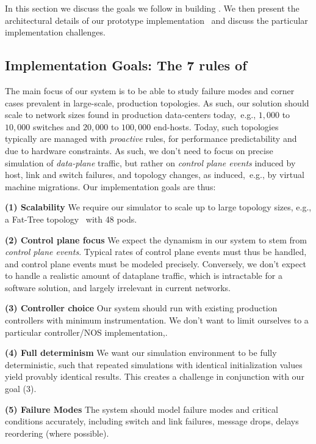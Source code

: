 In this section we discuss the goals we follow in building \projectname.
We then present the architectural details of our prototype implementation~\cite{prototype}
and discuss the particular implementation challenges.

\subsection{Implementation Goals: The 7 rules of \projectname{}}

The main focus of our system is to be able to study failure modes and corner
cases prevalent in large-scale, production topologies. As such, our solution
should scale to network sizes found in production data-centers today,~e.g.,
$1,000$ to $10,000$ switches and $20,000$ to $100,000$ end-hosts. Today, such
topologies typically are managed with \emph{proactive} rules, for performance
predictability and due to hardware constraints. As such, we don't need to focus
on precise simulation of \emph{data-plane} traffic, but rather on \emph{control
plane events} induced by host, link and switch failures, and topology changes,
as induced,~e.g., by virtual machine migrations. Our implementation goals are
thus:

\textbf{(1) Scalability} 
We require our simulator to scale up to large topology sizes,
e.g., a Fat-Tree topology~\cite{fattree} with 48 pods. 

\textbf{(2) Control plane focus} We expect the dynamism in our system to stem from
\emph{control plane events}. Typical rates of control plane events must thus be
handled, and control plane events must be modeled precisely. Conversely, we
don't expect to handle a realistic amount of dataplane traffic, which is
intractable for a software solution, and largely irrelevant in current networks.

\textbf{(3) Controller choice} Our system should run with existing production
controllers with minimum instrumentation. We don't want to limit ourselves to
a particular controller/NOS implementation,.

\textbf{(4) Full determinism} We want our simulation environment to be fully 
deterministic, such that repeated simulations with identical initialization values
yield provably identical results. This creates a challenge in conjunction with our goal (3).

\textbf{(5) Failure Modes} The system should model failure modes and critical conditions
accurately, including switch and link failures, message drops, delays reordering (where possible).

